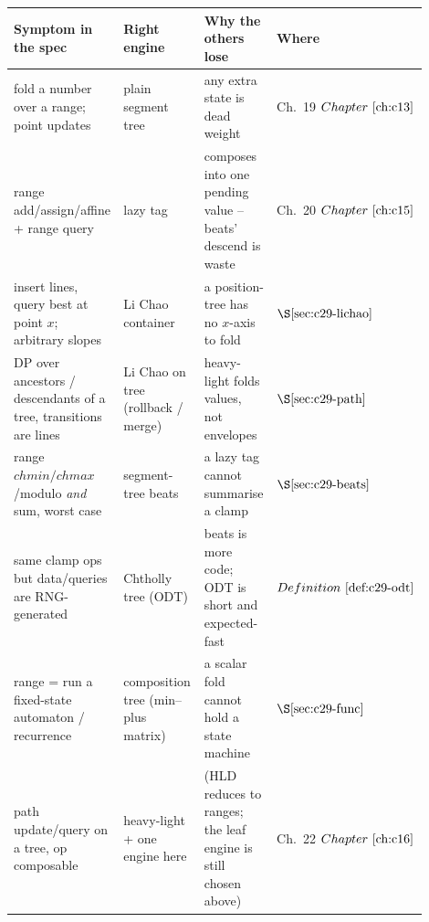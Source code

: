 \begin{center}
\small
\renewcommand{\arraystretch}{1.26}
\setlength{\tabcolsep}{4pt}
\begin{tabular}{@{}p{0.28\linewidth} p{0.24\linewidth} >{\raggedright\arraybackslash}p{0.20\linewidth} >{\centering\arraybackslash}p{0.18\linewidth}@{}}
\toprule
\textbf{Symptom in the spec} & \textbf{Right engine} & \textbf{Why the others lose} & \textbf{Where}\\
\midrule
fold a number over a range; point updates & plain segment tree & any extra state is dead weight & Ch.~19 \(\chref{c13}\)\\
range add/assign/affine + range query & lazy tag & composes into one pending value -- beats' descend is waste & Ch.~20 \(\chref{c15}\)\\
insert lines, query best at point \(x\); arbitrary slopes & Li Chao container & a position-tree has no \(x\)-axis to fold & \(\secref{c29-lichao}\)\\
DP over ancestors / descendants of a tree, transitions are lines & Li Chao on tree (rollback / merge) & heavy-light folds values, not envelopes & \(\secref{c29-path}\)\\
range \(\mathit{chmin}/\mathit{chmax}\)/modulo \emph{and} sum, worst case & segment-tree beats & a lazy tag cannot summarise a clamp & \(\secref{c29-beats}\)\\
same clamp ops but data/queries are RNG-generated & Chtholly tree (ODT) & beats is more code; ODT is short and expected-fast & \(\defref{c29-odt}\)\\
range = run a fixed-state automaton / recurrence & composition tree (min--plus matrix) & a scalar fold cannot hold a state machine & \(\secref{c29-func}\)\\
path update/query on a tree, op composable & heavy-light + one engine here & (HLD reduces to ranges; the leaf engine is still chosen above) & Ch.~22 \(\chref{c16}\)\\
\bottomrule
\end{tabular}
\end{center}

